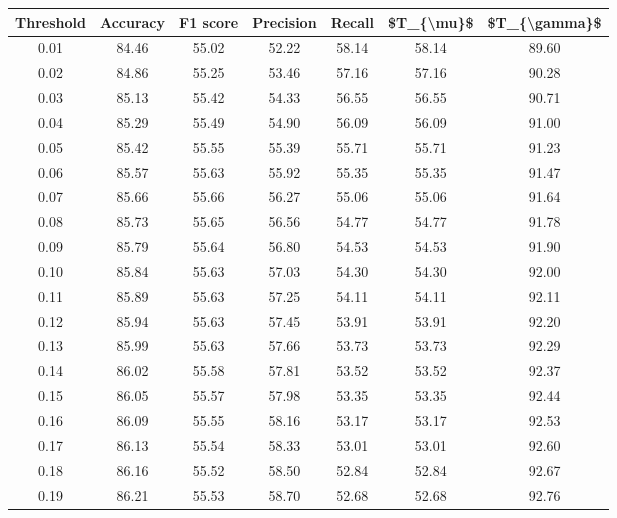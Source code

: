 \begin{tabular}{|c|c|c|c|c|c|c|}
\hline
 Threshold &  Accuracy &  F1 score &  Precision &  Recall &  \$T\_\{\textbackslash mu\}\$ &  \$T\_\{\textbackslash gamma\}\$ \\
\hline
      0.01 &     84.46 &     55.02 &      52.22 &   58.14 &      58.14 &         89.60 \\
      0.02 &     84.86 &     55.25 &      53.46 &   57.16 &      57.16 &         90.28 \\
      0.03 &     85.13 &     55.42 &      54.33 &   56.55 &      56.55 &         90.71 \\
      0.04 &     85.29 &     55.49 &      54.90 &   56.09 &      56.09 &         91.00 \\
      0.05 &     85.42 &     55.55 &      55.39 &   55.71 &      55.71 &         91.23 \\
      0.06 &     85.57 &     55.63 &      55.92 &   55.35 &      55.35 &         91.47 \\
      0.07 &     85.66 &     55.66 &      56.27 &   55.06 &      55.06 &         91.64 \\
      0.08 &     85.73 &     55.65 &      56.56 &   54.77 &      54.77 &         91.78 \\
      0.09 &     85.79 &     55.64 &      56.80 &   54.53 &      54.53 &         91.90 \\
      0.10 &     85.84 &     55.63 &      57.03 &   54.30 &      54.30 &         92.00 \\
      0.11 &     85.89 &     55.63 &      57.25 &   54.11 &      54.11 &         92.11 \\
      0.12 &     85.94 &     55.63 &      57.45 &   53.91 &      53.91 &         92.20 \\
      0.13 &     85.99 &     55.63 &      57.66 &   53.73 &      53.73 &         92.29 \\
      0.14 &     86.02 &     55.58 &      57.81 &   53.52 &      53.52 &         92.37 \\
      0.15 &     86.05 &     55.57 &      57.98 &   53.35 &      53.35 &         92.44 \\
      0.16 &     86.09 &     55.55 &      58.16 &   53.17 &      53.17 &         92.53 \\
      0.17 &     86.13 &     55.54 &      58.33 &   53.01 &      53.01 &         92.60 \\
      0.18 &     86.16 &     55.52 &      58.50 &   52.84 &      52.84 &         92.67 \\
      0.19 &     86.21 &     55.53 &      58.70 &   52.68 &      52.68 &         92.76 \\

\end{tabular}
